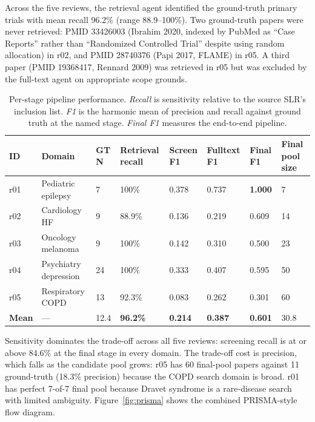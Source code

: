 \documentclass[a4paper,fleqn]{cas-sc}
\begin{document}
Across the five reviews, the retrieval agent identified the
ground-truth primary trials with mean recall 96.2\% (range 88.9--100\%).
Two ground-truth papers were never retrieved: PMID 33426003 (Ibrahim 2020,
indexed by PubMed as ``Case Reports'' rather than ``Randomized Controlled
Trial'' despite using random allocation) in r02, and PMID 28740376
(Papi 2017, FLAME) in r05. A third paper (PMID 19368417, Rennard 2009)
was retrieved in r05 but was excluded by the full-text agent on
appropriate scope grounds.

\begin{table}[t]
\caption{Per-stage pipeline performance. \textit{Recall} is sensitivity
relative to the source SLR's inclusion list. \textit{F1} is the harmonic
mean of precision and recall against ground truth at the
named stage. \textit{Final F1} measures the end-to-end pipeline.}
\label{tbl:pipeline}
\begin{tabular*}{\tblwidth}{@{}p{0.6cm}p{2.6cm}p{1.0cm}p{1.6cm}p{1.4cm}p{1.4cm}p{1.4cm}p{2.5cm}@{}}
\toprule
ID & Domain & GT N & Retrieval recall & Screen F1 & Fulltext F1 & Final F1 & Final pool size \\
\midrule
r01 & Pediatric epilepsy   & 7  & 100\%  & 0.378 & 0.737 & \textbf{1.000} & 7 \\
r02 & Cardiology HF        & 9  & 88.9\% & 0.136 & 0.219 & 0.609          & 14 \\
r03 & Oncology melanoma    & 9  & 100\%  & 0.142 & 0.310 & 0.500          & 23 \\
r04 & Psychiatry depression & 24 & 100\%  & 0.333 & 0.407 & 0.595          & 50 \\
r05 & Respiratory COPD     & 13 & 92.3\% & 0.083 & 0.262 & 0.301          & 60 \\
\midrule
\textbf{Mean} & ---       & 12.4 & \textbf{96.2\%} & \textbf{0.214} & \textbf{0.387} & \textbf{0.601} & 30.8 \\
\bottomrule
\end{tabular*}
\end{table}

Sensitivity dominates the trade-off across all five reviews: screening
recall is at or above 84.6\% at the final stage in every domain. The
trade-off cost is precision, which falls as the candidate pool grows:
r05 has 60 final-pool papers against 11 ground-truth (18.3\% precision)
because the COPD search domain is broad. r01 has perfect 7-of-7 final
pool because Dravet syndrome is a rare-disease search with limited
ambiguity. Figure~\ref{fig:prisma} shows the combined PRISMA-style flow
diagram.
\end{document}
